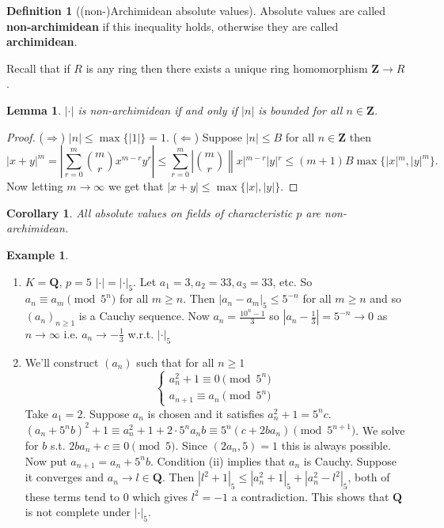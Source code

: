 \documentclass[10pt,]{book}
\newcommand{\terminology}[1]{\textbf{#1}}
\theoremstyle{plain}
\newtheorem{corollary}[theorem]{Corollary}
\newtheorem{lemma}[theorem]{Lemma}
\theoremstyle{definition}
\newtheorem{definition}[theorem]{Definition}
\newtheorem{example}[theorem]{Example}
\newcommand{\QQ}{\mathbf{Q}}
\newcommand{\ZZ}{\mathbf{Z}}
\newcommand{\ab}{|\cdot|}
\begin{document}
\begin{definition}[(non-)Archimidean absolute values]\label{definition-2}
Absolute values are called \terminology{non-archimidean} if this inequality holds, otherwise they are called \terminology{archimidean}.
        \end{definition}
\par
Recall that if \(R\) is any ring then there exists a unique ring homomorphism \(\ZZ \to R\).%
\begin{lemma}\label{lemma-1}
\(\ab\) is non-archimidean if and only if \(|n|\) is bounded for all \(n \in \ZZ\).\end{lemma}
\begin{proof}

          (\(\Rightarrow\)) \(|n| \le \max\{|1|\} = 1\).\newline{}
          (\(\Leftarrow\)) Suppose \(|n| \le B\) for all \(n \in \ZZ\) then \[|x+ y|^m = \left| \sum_{r = 0}^{m} \binom{m}{r} x^{m-r}y^r\right| \le \sum_{r=0}^m\left|\binom{m}{r}\right\|x|^{m-r}|y|^r \le (m+1)B \max\{|x|^m, |y|^m\}.\]
          Now letting \(m \to \infty\) we get that \(|x+y| \le \max\{|x|, |y|\}\).
        \end{proof}
\begin{corollary}\label{corollary-1}
All absolute values on fields of characteristic \(p\) are non-archimidean.\end{corollary}
\begin{example}\label{example-3}
\begin{enumerate}
\item{}\(K = \QQ\), \(p = 5\) \(\ab = \ab_5\).
            Let \(a_1 =3,a_2=33,a_3=33\), etc.
            So \(a_n \equiv a_m \pmod{5^n}\) for all \(m \ge n\).
            Then \(|a_n -a_m|_5 \le 5^{-n}\) for all \(m \ge n\) and so \((a_n)_{n\ge1}\) is a Cauchy sequence.
            Now \(a_n = \frac{10^n - 1}{3}\) so \(|a_n - \frac13| = 5^{-n}\to 0\) as \(n \to \infty\) i.e. \( a_n\to-\frac13\) w.r.t. \(\ab_5\)
          \item{}
            We'll construct \((a_n)\) such that for all \(n \ge 1\)
            \[
              \begin{cases}a_n^2 +1  \equiv 0 \pmod{5^n}\\
              a_{n+1} \equiv a_n \pmod{5^n}
              \end{cases}
            \]
            Take \(a_1 = 2\).
            Suppose \(a_n\) is chosen and it satisfies \(a_n^2  + 1 = 5^n c\).
            \((a_n + 5^n b)^2 + 1 \equiv a_n^2 + 1 + 2\cdot 5^n a_nb \equiv 5^n(c+2ba_n) \pmod{5^{n+1}}\).
            We solve for \(b\) s.t. \(2ba_n + c \equiv 0\pmod{5}\).
            Since \((2a_n,5) = 1\) this is always possible.
            Now put \(a_{n+1} = a_n+5^nb\).
            Condition (ii) implies that \(a_n\) is Cauchy.
            Suppose it converges and \(a_n\to l\in \QQ\).
            Then \(|l^2 + 1|_5 \le |a_n^2 + 1|_5 +|a_n^2 - l^2|_5\), both of these terms tend to 0 which gives \(l^2 = -1\) a contradiction.
            This shows that \(\QQ\) is not complete under \(\ab_5\).
          \end{enumerate}
\end{example}
\end{document}
